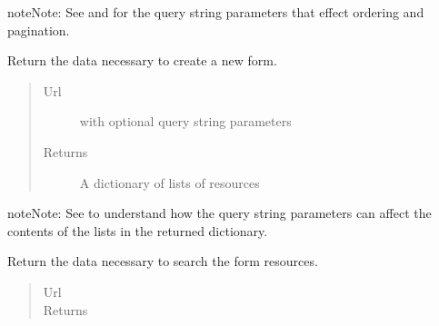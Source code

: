 \documentclass[letterpaper,10pt,english]{sphinxmanual}
\begin{document}
\begin{fulllineitems}
\begin{fulllineitems}
\begin{quote}
\begin{description}
\end{description}\end{quote}

\begin{notice}{note}{Note:}
See  and  for the
query string parameters that effect ordering and pagination.
\end{notice}

\end{fulllineitems}


\begin{fulllineitems}
\label{api:onlinelinguisticdatabase.controllers.forms.FormsController.new}
Return the data necessary to create a new form.
\begin{quote}\begin{description}
\item[{Url }] \leavevmode
{} with optional query string parameters

\item[{Returns}] \leavevmode
A dictionary of lists of resources

\end{description}\end{quote}

\begin{notice}{note}{Note:}
See  to understand how the query string
parameters can affect the contents of the lists in the returned
dictionary.
\end{notice}

\end{fulllineitems}


\begin{fulllineitems}
\label{api:onlinelinguisticdatabase.controllers.forms.FormsController.new_search}
Return the data necessary to search the form resources.
\begin{quote}\begin{description}
\item[{Url }] \leavevmode
{}

\item[{Returns}] \leavevmode
{}


\end{description}
\end{quote}
\end{fulllineitems}
\end{fulllineitems}
\end{document}
